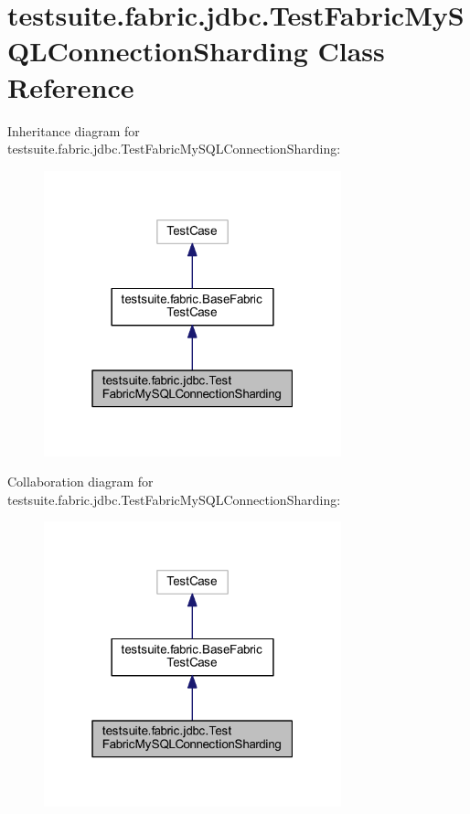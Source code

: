 \hypertarget{classtestsuite_1_1fabric_1_1jdbc_1_1_test_fabric_my_s_q_l_connection_sharding}{}\section{testsuite.\+fabric.\+jdbc.\+Test\+Fabric\+My\+S\+Q\+L\+Connection\+Sharding Class Reference}
\label{classtestsuite_1_1fabric_1_1jdbc_1_1_test_fabric_my_s_q_l_connection_sharding}


Inheritance diagram for testsuite.\+fabric.\+jdbc.\+Test\+Fabric\+My\+S\+Q\+L\+Connection\+Sharding\+:
\nopagebreak
\begin{figure}[H]
\begin{center}
\leavevmode
\includegraphics[width=244pt]{classtestsuite_1_1fabric_1_1jdbc_1_1_test_fabric_my_s_q_l_connection_sharding__inherit__graph}
\end{center}
\end{figure}


Collaboration diagram for testsuite.\+fabric.\+jdbc.\+Test\+Fabric\+My\+S\+Q\+L\+Connection\+Sharding\+:
\nopagebreak
\begin{figure}[H]
\begin{center}
\leavevmode
\includegraphics[width=244pt]{classtestsuite_1_1fabric_1_1jdbc_1_1_test_fabric_my_s_q_l_connection_sharding__coll__graph}
\end{center}
\end{figure}
